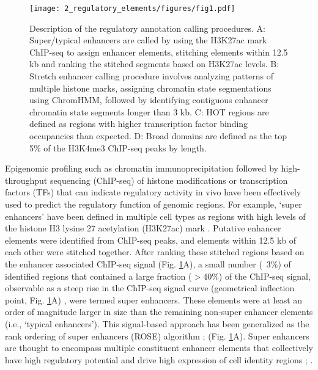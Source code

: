 \begin{figure}
    \centering
    \texttt{[image: 2\_regulatory\_elements/figures/fig1.pdf]}
    \caption{Description of the regulatory annotation calling procedures. A: Super/typical enhancers are called by using the H3K27ac mark ChIP-seq to assign enhancer elements, stitching elements within 12.5 kb and ranking the stitched segments based on H3K27ac levels. B: Stretch enhancer calling procedure involves analyzing patterns of multiple histone marks, assigning chromatin state segmentations using ChromHMM, followed by identifying contiguous enhancer chromatin state segments longer than 3 kb. C: HOT regions are defined as regions with higher transcription factor binding occupancies than expected. D: Broad domains are defined as the top 5\% of the H3K4me3 ChIP-seq peaks by length.}
    \label{fig:c1_f1}
\end{figure}

Epigenomic profiling such as chromatin immunoprecipitation followed by high-throughput sequencing (ChIP-seq) of histone modifications or transcription factors (TFs) that can indicate regulatory activity in vivo have been effectively used to predict the regulatory function of genomic regions. For example, ‘super enhancers’ have been defined in multiple cell types as regions with high levels of the histone H3 lysine 27 acetylation (H3K27ac) mark \cite{hniszSuperEnhancersControlCell2013}. Putative enhancer elements were identified from ChIP-seq peaks, and elements within 12.5 kb of each other were stitched together. After ranking these stitched regions based on the enhancer associated ChIP-seq signal (Fig. \ref{fig:c1_f1}A), a small number (~3\%) of identified regions that contained a large fraction ($>$40\%) of the ChIP-seq signal, observable as a steep rise in the ChIP-seq signal curve (geometrical inflection point, Fig. \ref{fig:c1_f1}A) \cite{whyteMasterTranscriptionFactors2013}, were termed super enhancers. These elements were at least an order of magnitude larger in size than the remaining non-super enhancer elements (i.e., ‘typical enhancers’). This signal-based approach has been generalized as the rank ordering of super enhancers (ROSE) algorithm \cite{lovenSelectiveInhibitionTumor2013}; \cite{whyteMasterTranscriptionFactors2013} (Fig. \ref{fig:c1_f1}A). Super enhancers are thought to encompass multiple constituent enhancer elements that collectively have high regulatory potential and drive high expression of cell identity regions \cite{whyteMasterTranscriptionFactors2013}; \cite{hniszSuperEnhancersControlCell2013}. \\

